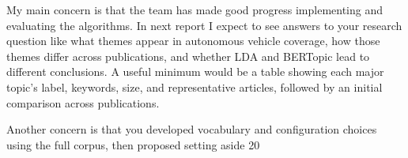 My main concern is that the team has made good progress implementing and evaluating the algorithms. In next report I expect to see answers to your research question like what themes appear in autonomous vehicle coverage, how those themes differ across publications, and whether LDA and BERTopic lead to different conclusions. A useful minimum would be a table showing each major topic’s label, keywords, size, and representative articles, followed by an initial comparison across publications. 

Another concern is that you developed vocabulary and configuration choices using the full corpus, then proposed setting aside 20%